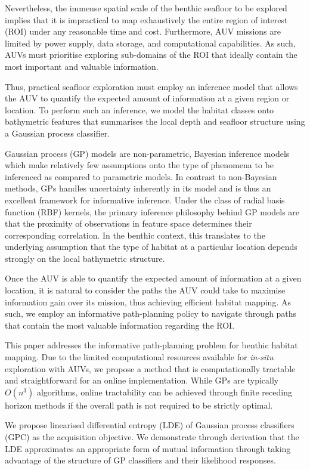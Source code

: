 \documentclass{article}
\begin{document}
	Nevertheless, the immense spatial scale of the benthic seafloor to be explored implies that it is impractical to map exhaustively the entire region of interest (ROI) under any reasonable time and cost. Furthermore, AUV missions are limited by power supply, data storage, and computational capabilities. As such, AUVs must prioritise exploring sub-domains of the ROI that ideally contain the most important and valuable information.
	
	Thus, practical seafloor exploration must employ an inference model that allows the AUV to quantify the expected amount of information at a given region or location. To perform such an inference, we model the habitat classes onto bathymetric features that summarises the local depth and seafloor structure using a Gaussian process classifier.

	Gaussian process (GP) models are non-parametric, Bayesian inference models which make relatively few assumptions onto the type of phenomena to be inferenced as compared to parametric models. In contrast to non-Bayesian methods, GPs handles uncertainty inherently in its model and is thus an excellent framework for informative inference. Under the class of radial basis function (RBF) kernels, the primary inference philosophy behind GP models are that the proximity of observations in feature space determines their corresponding correlation. In the benthic context, this translates to the underlying assumption that the type of habitat at a particular location depends strongly on the local bathymetric structure.
		
	Once the AUV is able to quantify the expected amount of information at a given location, it is natural to consider the paths the AUV could take to maximise information gain over its mission, thus achieving efficient habitat mapping. As such, we employ an informative path-planning policy to navigate through paths that contain the most valuable information regarding the ROI. 
	
	This paper addresses the informative path-planning problem for benthic habitat mapping. Due to the limited computational resources available for \textit{in-situ} exploration with AUVs, we propose a method that is computationally tractable and straightforward for an online implementation. While GPs are typically $O(n^{3})$ algorithms, online tractability can be achieved through finite receding horizon methods if the overall path is not required to be strictly optimal.
	
	We propose linearised differential entropy (LDE) of Gaussian process classifiers (GPC) as the acquisition objective. We demonstrate through derivation that the LDE approximates an appropriate form of mutual information through taking advantage of the structure of GP classifiers and their likelihood responses.
	
\end{document}
